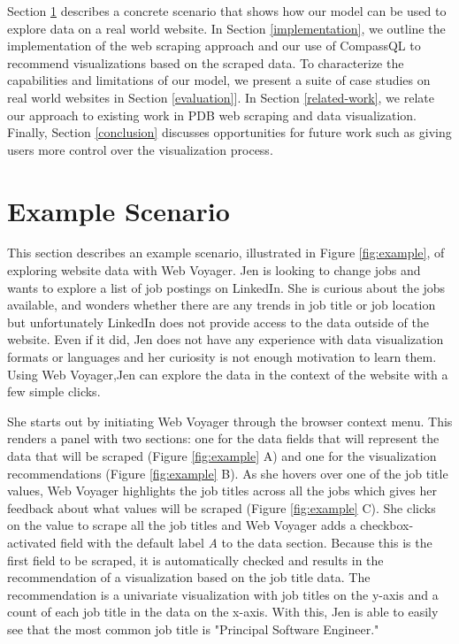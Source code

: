 \documentclass{vgtc}                          %
\begin{document}
Section \ref{demo} describes a concrete scenario that shows how our model can be used to explore data on a real world website. In Section \ref{implementation}, we outline the implementation of the web scraping approach and our use of CompassQL to recommend visualizations based on the scraped data. To characterize the capabilities and limitations of our model, we present a suite of case studies on real world websites in Section \ref{evaluation}]. In Section \ref{related-work}, we relate our approach to existing work in PDB web scraping and data visualization. Finally, Section \ref{conclusion} discusses opportunities for future work such as giving users more control over the visualization process.

\section{Example Scenario} \label{demo}

This section describes an example scenario, illustrated in Figure \ref{fig:example}, of exploring website data with Web Voyager.
Jen is looking to change jobs and wants to explore a list of job postings on LinkedIn. She is curious about the jobs available, and
wonders whether there are any trends in job title or job location but unfortunately LinkedIn does not provide access to the data outside
of the website. Even if it did, Jen does not have any experience with data visualization formats or languages and her curiosity is not enough
motivation to learn them. Using Web Voyager,Jen can explore the data in the context of the website with a few simple clicks.

She starts out by initiating Web Voyager through the browser context menu. This renders a panel with two sections: one for the data fields
that will represent the data that will be scraped (Figure \ref{fig:example} A) and one for the visualization recommendations (Figure \ref{fig:example} B).
As she hovers over one of the job title values, Web Voyager highlights the job titles across all the jobs which gives her feedback about what values will
be scraped (Figure \ref{fig:example} C). She clicks on the value to scrape all the job titles and Web Voyager adds a checkbox-activated field with the default
label \emph{A} to the data section. Because this is the first field to be scraped, it is automatically checked and results in the recommendation of a visualization
based on the job title data. The recommendation is a univariate visualization with job titles on the y-axis and a count of each job title in the data on the x-axis.
With this, Jen is able to easily see that the most common job title is "Principal Software Engineer."
\end{document}
